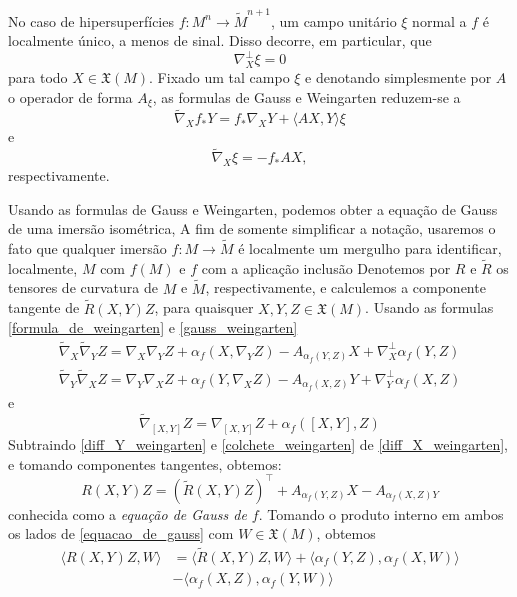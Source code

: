 \begin{observacao}
	No caso de hipersuperfícies $f: M^n \rightarrow \tilde{M}^{n+1}$, um campo unitário $\xi$ normal a $f$ é localmente único, a menos de sinal. Disso decorre, em particular, que
	\begin{equation*}
		\nabla_{X}^\perp \xi = 0
	\end{equation*}
	para todo $X \in \mathfrak{X}(M)$. Fixado um tal campo $\xi$ e denotando simplesmente por $A$ o operador de forma $A_\xi$, as formulas de Gauss e Weingarten reduzem-se a
	\begin{equation}\label{gauss_weingarten}
		\tilde{\nabla}_X f_* Y = f_* \nabla_X Y + \langle AX,Y \rangle \xi
	\end{equation}
	e
	\begin{equation*}
		\tilde{\nabla}_X \xi = -f_* AX,
	\end{equation*}
	respectivamente.
\end{observacao}

Usando as formulas de Gauss e Weingarten, podemos obter a equação de Gauss de uma imersão isométrica, A fim de somente simplificar a notação, usaremos o fato que qualquer imersão $f: M \rightarrow \tilde{M}$ é localmente um mergulho para identificar, localmente, $M$ com $f(M)$ e $f$ com a aplicação inclusão
Denotemos por $R$ e $\tilde{R}$ os tensores de curvatura de $M$ e $\tilde{M}$, respectivamente, e calculemos a componente tangente de $\tilde{R}(X,Y)Z$, para quaisquer $X,Y,Z \in \mathfrak{X}(M)$. Usando as formulas \eqref{formula_de_weingarten} e \eqref{gauss_weingarten}
\begin{align}
	\label{diff_X_weingarten} \tilde{\nabla}_X \tilde{\nabla}_Y Z = \nabla_X \nabla_Y Z + \alpha_f(X, \nabla_Y Z) - A_{\alpha_f(Y,Z)} X + \nabla_X^\perp \alpha_f(Y,Z)\\
	\label{diff_Y_weingarten} \tilde{\nabla}_Y \tilde{\nabla}_X Z = \nabla_Y \nabla_X Z + \alpha_f(Y, \nabla_X Z) - A_{\alpha_f(X,Z)} Y + \nabla_Y^\perp \alpha_f(X,Z)
\end{align}
e
\begin{equation*}\label{colchete_weingarten}
	\tilde{\nabla}_{[X,Y]} Z = \nabla_{[X,Y]} Z + \alpha_f([X,Y],Z)
\end{equation*}
Subtraindo \eqref{diff_Y_weingarten} e \eqref{colchete_weingarten} de \eqref{diff_X_weingarten}, e tomando componentes tangentes, obtemos:
\begin{equation}\label{equacao_de_gauss}
	R(X,Y)Z = (\tilde{R}(X,Y)Z)^\top + A_{\alpha_f (Y,Z)} X - A_{\alpha_f(X,Z)Y}
\end{equation}
conhecida como a \emph{equação de Gauss de $f$}. Tomando o produto interno em ambos os lados de \eqref{equacao_de_gauss} com $W \in \mathfrak{X}(M)$, obtemos
\begin{align*}
	\langle R(X,Y)Z,W \rangle &= \langle \tilde{R}(X,Y)Z,W \rangle + \langle \alpha_f(Y,Z), \alpha_f(X,W) \rangle\\
	& - \langle \alpha_f(X,Z), \alpha_f(Y,W) \rangle
\end{align*}

